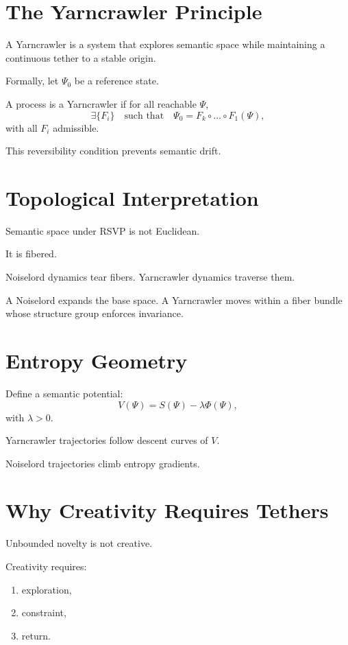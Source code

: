 \documentclass[11pt]{book}
\begin{document}
\section{The Yarncrawler Principle}

A Yarncrawler is a system that explores semantic space while maintaining a
continuous tether to a stable origin.

Formally, let \(\Psi_0\) be a reference state.

\begin{definition}
A process is a Yarncrawler if for all reachable \(\Psi\),
\[
\exists \{F_i\} \quad \text{such that} \quad \Psi_0 = F_k \circ \dots \circ F_1(\Psi),
\]
with all \(F_i\) admissible.
\end{definition}

This reversibility condition prevents semantic drift.

\section{Topological Interpretation}

Semantic space under RSVP is not Euclidean.

It is fibered.

Noiselord dynamics tear fibers.
Yarncrawler dynamics traverse them.

A Noiselord expands the base space.
A Yarncrawler moves within a fiber bundle whose structure group enforces
invariance.

\section{Entropy Geometry}

Define a semantic potential:
\[
V(\Psi) = S(\Psi) - \lambda \Phi(\Psi),
\]
with \(\lambda > 0\).

Yarncrawler trajectories follow descent curves of \(V\).

Noiselord trajectories climb entropy gradients.

\section{Why Creativity Requires Tethers}

Unbounded novelty is not creative.

Creativity requires:

\begin{enumerate}
\item exploration,
\item constraint,
\item return.
\end{enumerate}
\end{document}
